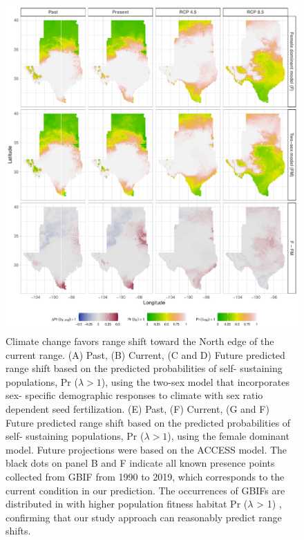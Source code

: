 \documentclass[12pt]{article}\usepackage[]{graphicx}\usepackage[dvipsnames]{xcolor}
\begin{document}
\begin{figure}[H]
	\begin{center}
		\includegraphics[width=0.95\linewidth]{Figures/Fig_geoPrlambdaacc.pdf}
		\caption{Climate change favors range shift toward the North edge of the current range.
			(A) Past, (B) Current, (C and D) Future predicted range shift based on the predicted probabilities of self- sustaining populations, Pr ($\lambda > 1$), using the two-sex model that incorporates sex- specific demographic responses to climate with sex ratio dependent seed fertilization.
			(E) Past, (F) Current, (G and F) Future  predicted range shift based on the predicted probabilities of self- sustaining populations, Pr ($\lambda > 1$), using the female dominant model.
			Future projections were based on the  ACCESS model.
			The black dots on panel B and F indicate all known presence points collected from GBIF from 1990 to 2019, which corresponds to the current condition in our prediction. 
			The occurrences of GBIFs are distributed in with higher population fitness habitat Pr ($\lambda$ > 1) , confirming that our study approach can reasonably predict range shifts.}
		\label{Sup:geoprojcmc}
	\end{center}
\end{figure}
\end{document}
